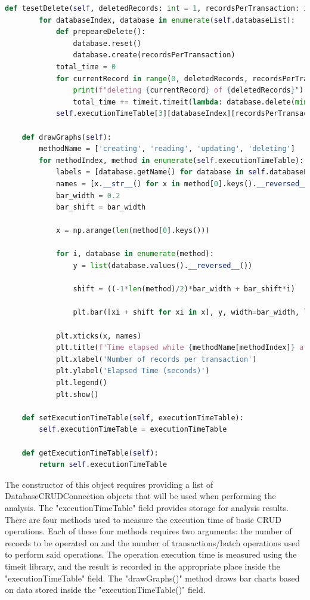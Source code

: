 \begin{lstlisting}[language=Python, caption=DatabaseTester]
    def tesetDelete(self, deletedRecords: int = 1, recordsPerTransaction: int = 1):
        for databaseIndex, database in enumerate(self.databaseList):
            def prepeareDelete():
                database.reset()
                database.create(recordsPerTransaction)
            total_time = 0
            for currentRecord in range(0, deletedRecords, recordsPerTransaction):
                print(f"deleting {currentRecord} of {deletedRecords}")
                total_time += timeit.timeit(lambda: database.delete(min(recordsPerTransaction, deletedRecords - recordsPerTransaction)), lambda: prepeareDelete(), number=10)
            self.executionTimeTable[3][databaseIndex][recordsPerTransaction] = total_time

    def drawGraphs(self):
        methodName = ['creating', 'reading', 'updating', 'deleting']
        for methodIndex, method in enumerate(self.executionTimeTable):
            labels = [database.getName() for database in self.databaseList]
            names = [x.__str__() for x in method[0].keys().__reversed__()]
            bar_width = 0.2
            bar_shift = bar_width

            x = np.arange(len(method[0].keys()))

            for i, database in enumerate(method):
                y = list(database.values().__reversed__())

                shift = ((-1*len(method)/2)*bar_width + bar_shift*i)

                plt.bar([xi + shift for xi in x], y, width=bar_width, label=labels[i])

            plt.xticks(x, names)
            plt.title(f'Time elapsed while {methodName[methodIndex]} a 1000 records.')
            plt.xlabel('Number of records per transaction')
            plt.ylabel('Elapsed Time (seconds)')
            plt.legend()
            plt.show()

    def setExecutionTimeTable(self, executionTimeTable):
        self.executionTimeTable = executionTimeTable

    def getExecutionTimeTable(self):
        return self.executionTimeTable
\end{lstlisting}
\par The constructor of this object requires providing a list of DatabaseCRUDConnection objects that will be used when performing the analysis. The "executionTimeTable" field provides storage for analysis results. There are four methods used to measure the execution time of basic CRUD operations. Each of these four methods requires two arguments: the number of records to be operated on and the number of transactions/batch operations used to perform said operations. The operation execution time is measured using the timeit library, and the result is recorded in the appropriate place inside the "executionTimeTable" field. The "drawGraphs()" method draws bar charts based on data stored inside the "executionTimeTable()" field.
